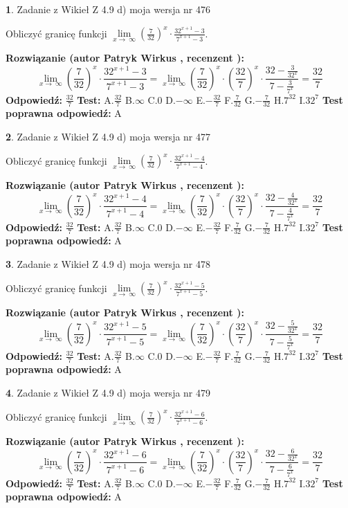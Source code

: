 \documentclass[12pt, a4paper]{article}
\theoremstyle{definition} %
\newtheorem{zad}{}
\newcommand{\zadStart}[1]{\begin{zad}#1\newline}
\newcommand{\zadStop}{\end{zad}}
\newcommand{\rozwStart}[2]{\noindent \textbf{Rozwiązanie (autor #1 , recenzent #2): }\newline}
\newcommand{\rozwStop}{\newline}
\newcommand{\odpStart}{\noindent \textbf{Odpowiedź:}\newline}
\newcommand{\odpStop}{\newline}
\newcommand{\testStart}{\noindent \textbf{Test:}\newline}
\newcommand{\testStop}{\newline}
\newcommand{\kluczStart}{\noindent \textbf{Test poprawna odpowiedź:}\newline}
\newcommand{\kluczStop}{\newline}
\begin{document}
\zadStart{Zadanie z Wikieł Z 4.9 d) moja wersja nr 476}


Obliczyć granicę funkcji  $\lim\limits_{x\to\ \infty}(\frac{7}{32})^{x}\cdot\frac{32^{x+1}-3}{7^{x+1}-3}$.
\zadStop
\rozwStart{Patryk Wirkus}{}
$$\lim\limits_{x\to\ \infty}(\frac{7}{32})^{x}\cdot\frac{32^{x+1}-3}{7^{x+1}-3}=\lim\limits_{x\to\ \infty}(\frac{7}{32})^{x}\cdot(\frac{32}{7})^{x} \cdot \frac{32-\frac{3}{32^{x}}}{7-\frac{3}{7^{x}}} = \frac{32}{7}$$
\rozwStop
\odpStart
$\frac{32}{7}$
\odpStop
\testStart
A.$\frac{32}{7}$ B.$\infty$ C.$0$ D.$-\infty$ E.$-\frac{32}{7}$
F.$\frac{7}{32}$ G.$-\frac{7}{32}$
H.$7^{32}$
I.$32^{7}$
\testStop
\kluczStart
A
\kluczStop



\zadStart{Zadanie z Wikieł Z 4.9 d) moja wersja nr 477}


Obliczyć granicę funkcji  $\lim\limits_{x\to\ \infty}(\frac{7}{32})^{x}\cdot\frac{32^{x+1}-4}{7^{x+1}-4}$.
\zadStop
\rozwStart{Patryk Wirkus}{}
$$\lim\limits_{x\to\ \infty}(\frac{7}{32})^{x}\cdot\frac{32^{x+1}-4}{7^{x+1}-4}=\lim\limits_{x\to\ \infty}(\frac{7}{32})^{x}\cdot(\frac{32}{7})^{x} \cdot \frac{32-\frac{4}{32^{x}}}{7-\frac{4}{7^{x}}} = \frac{32}{7}$$
\rozwStop
\odpStart
$\frac{32}{7}$
\odpStop
\testStart
A.$\frac{32}{7}$ B.$\infty$ C.$0$ D.$-\infty$ E.$-\frac{32}{7}$
F.$\frac{7}{32}$ G.$-\frac{7}{32}$
H.$7^{32}$
I.$32^{7}$
\testStop
\kluczStart
A
\kluczStop



\zadStart{Zadanie z Wikieł Z 4.9 d) moja wersja nr 478}


Obliczyć granicę funkcji  $\lim\limits_{x\to\ \infty}(\frac{7}{32})^{x}\cdot\frac{32^{x+1}-5}{7^{x+1}-5}$.
\zadStop
\rozwStart{Patryk Wirkus}{}
$$\lim\limits_{x\to\ \infty}(\frac{7}{32})^{x}\cdot\frac{32^{x+1}-5}{7^{x+1}-5}=\lim\limits_{x\to\ \infty}(\frac{7}{32})^{x}\cdot(\frac{32}{7})^{x} \cdot \frac{32-\frac{5}{32^{x}}}{7-\frac{5}{7^{x}}} = \frac{32}{7}$$
\rozwStop
\odpStart
$\frac{32}{7}$
\odpStop
\testStart
A.$\frac{32}{7}$ B.$\infty$ C.$0$ D.$-\infty$ E.$-\frac{32}{7}$
F.$\frac{7}{32}$ G.$-\frac{7}{32}$
H.$7^{32}$
I.$32^{7}$
\testStop
\kluczStart
A
\kluczStop



\zadStart{Zadanie z Wikieł Z 4.9 d) moja wersja nr 479}


Obliczyć granicę funkcji  $\lim\limits_{x\to\ \infty}(\frac{7}{32})^{x}\cdot\frac{32^{x+1}-6}{7^{x+1}-6}$.
\zadStop
\rozwStart{Patryk Wirkus}{}
$$\lim\limits_{x\to\ \infty}(\frac{7}{32})^{x}\cdot\frac{32^{x+1}-6}{7^{x+1}-6}=\lim\limits_{x\to\ \infty}(\frac{7}{32})^{x}\cdot(\frac{32}{7})^{x} \cdot \frac{32-\frac{6}{32^{x}}}{7-\frac{6}{7^{x}}} = \frac{32}{7}$$
\rozwStop
\odpStart
$\frac{32}{7}$
\odpStop
\testStart
A.$\frac{32}{7}$ B.$\infty$ C.$0$ D.$-\infty$ E.$-\frac{32}{7}$
F.$\frac{7}{32}$ G.$-\frac{7}{32}$
H.$7^{32}$
I.$32^{7}$
\testStop
\kluczStart
A
\kluczStop
\end{document}
